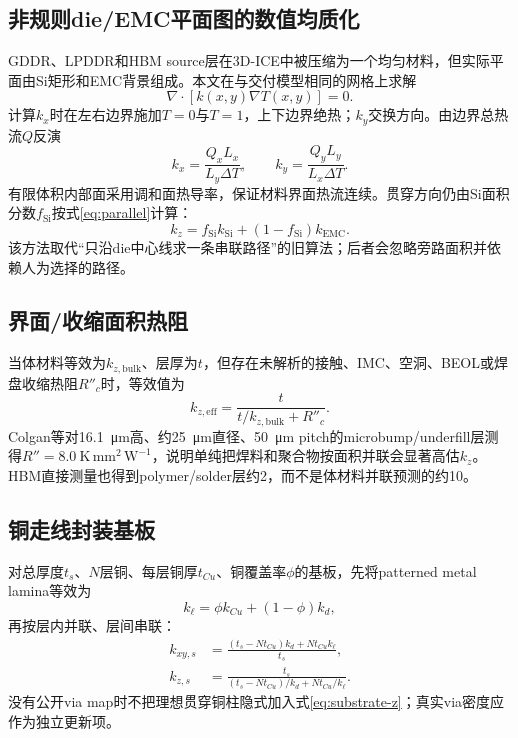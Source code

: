 \documentclass[UTF8,zihao=-4]{ctexart}
\begin{document}
\subsection{非规则die/EMC平面图的数值均质化}

GDDR、LPDDR和HBM source层在3D-ICE中被压缩为一个均匀材料，但实际平面由Si矩形和EMC背景组成。本文在与交付模型相同的网格上求解
\begin{equation}
  \nabla\cdot\left[k(x,y)\nabla T(x,y)\right]=0.
  \label{eq:cell-problem}
\end{equation}
计算$k_x$时在左右边界施加$T=0$与$T=1$，上下边界绝热；$k_y$交换方向。由边界总热流$Q$反演
\begin{equation}
  k_x=\frac{Q_x L_x}{L_y\Delta T},\qquad
  k_y=\frac{Q_y L_y}{L_x\Delta T}.
  \label{eq:fvm-inversion}
\end{equation}
有限体积内部面采用调和面热导率，保证材料界面热流连续。贯穿方向仍由Si面积分数$f_{\mathrm{Si}}$按式\eqref{eq:parallel}计算：
\begin{equation}
  k_z=f_{\mathrm{Si}}k_{\mathrm{Si}}+(1-f_{\mathrm{Si}})k_{\mathrm{EMC}}.
  \label{eq:active-kz}
\end{equation}
该方法取代“只沿die中心线求一条串联路径”的旧算法；后者会忽略旁路面积并依赖人为选择的路径。

\subsection{界面/收缩面积热阻}

当体材料等效为$k_{z,\mathrm{bulk}}$、层厚为$t$，但存在未解析的接触、IMC、空洞、BEOL或焊盘收缩热阻$R''_c$时，等效值为
\begin{equation}
  k_{z,\mathrm{eff}}
  =\frac{t}{t/k_{z,\mathrm{bulk}}+R''_c}.
  \label{eq:contact}
\end{equation}
Colgan等对\SI{16.1}{\micro\metre}高、约\SI{25}{\micro\metre}直径、\SI{50}{\micro\metre} pitch的microbump/underfill层测得$R''=8.0~\mathrm{K\,mm^2\,W^{-1}}$\cite{Colgan2012}，说明单纯把焊料和聚合物按面积并联会显著高估$k_z$。HBM直接测量也得到polymer/solder层约\SI{2}{\tcond}，而不是体材料并联预测的约\SI{10}{\tcond}\cite{ChaliseCahill2023}。

\subsection{铜走线封装基板}

对总厚度$t_s$、$N$层铜、每层铜厚$t_{Cu}$、铜覆盖率$\phi$的基板，先将patterned metal lamina等效为
\begin{equation}
  k_{\ell}=\phi k_{Cu}+(1-\phi)k_d,
\end{equation}
再按层内并联、层间串联\cite{JohnsonEyman1998}：
\begin{align}
  k_{xy,s}&=\frac{(t_s-Nt_{Cu})k_d+Nt_{Cu}k_{\ell}}{t_s},
  \label{eq:substrate-xy}\\
  k_{z,s}&=\frac{t_s}{(t_s-Nt_{Cu})/k_d+Nt_{Cu}/k_{\ell}}.
  \label{eq:substrate-z}
\end{align}
没有公开via map时不把理想贯穿铜柱隐式加入式\eqref{eq:substrate-z}；真实via密度应作为独立更新项。
\end{document}
